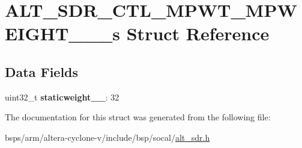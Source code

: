\hypertarget{structALT__SDR__CTL__MPWT__MPWEIGHT__0__4__s}{}\section{A\+L\+T\+\_\+\+S\+D\+R\+\_\+\+C\+T\+L\+\_\+\+M\+P\+W\+T\+\_\+\+M\+P\+W\+E\+I\+G\+H\+T\+\_\+\_\+\_\+s Struct Reference}
\label{structALT__SDR__CTL__MPWT__MPWEIGHT__0__4__s}
\subsection*{Data Fields}
\begin{DoxyCompactItemize}
\item 
\mbox{\label{structALT__SDR__CTL__MPWT__MPWEIGHT__0__4__s_adcdca870bd6d5abfbe7104257efb9145}} 
uint32\+\_\+t {\bfseries staticweight\+\_\+\_}\+: 32
\end{DoxyCompactItemize}


The documentation for this struct was generated from the following file\+:\begin{DoxyCompactItemize}
\item 
bsps/arm/altera-\/cyclone-\/v/include/bsp/socal/\mbox{\hyperlink{alt__sdr_8h}{alt\+\_\+sdr.\+h}}\end{DoxyCompactItemize}
